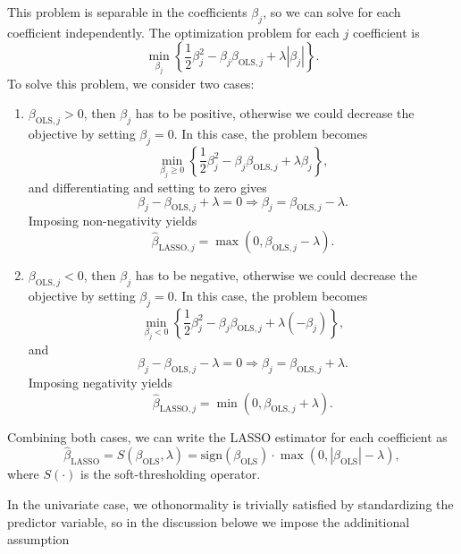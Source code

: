 \documentclass[11pt]{article}
\begin{document}
This problem is separable in the coefficients $\beta_j$, so we can solve for each coefficient independently. The optimization problem for each $j$ coefficient is
\[\min_{\beta_j} \left\{\frac{1}{2} \beta_j^2 - \beta_j \beta_{\text{OLS},j} + \lambda |\beta_j| \right\}.\]
To solve this problem, we consider two cases:
\begin{enumerate}
    \item $\beta_{\text{OLS},j} > 0$, then $\beta_j$ has to be positive, otherwise we could decrease the objective by setting $\beta_j = 0$. 
    In this case, the problem becomes 
    \[\min_{\beta_j \geq 0} \left\{ \frac{1}{2} \beta_j^2 - \beta_j \beta_{\text{OLS},j} + \lambda \beta_j \right\},\]
    and differentiating and setting to zero gives
    \[\beta_j - \beta_{\text{OLS},j} + \lambda = 0 \Rightarrow \beta_j = \beta_{\text{OLS},j} - \lambda.\]
    Imposing non-negativity yields
    \[\hat{\beta}_{\text{LASSO},j} = \max\left(0, \beta_{\text{OLS},j} - \lambda\right).\]
    \item $\beta_{\text{OLS},j} < 0$, then $\beta_j$ has to be negative, otherwise we could decrease the objective by setting $\beta_j = 0$. In this case, the problem becomes
    \[\min_{\beta_j < 0} \left\{ \frac{1}{2} \beta_j^2 - \beta_j \beta_{\text{OLS},j} + \lambda (-\beta_j) \right\},\]    
    and
    \[\beta_j - \beta_{\text{OLS},j} - \lambda = 0 \Rightarrow \beta_j = \beta_{\text{OLS},j} + \lambda.\]
    Imposing negativity yields
    \[\hat{\beta}_{\text{LASSO},j} = \min\left(0, \beta_{\text{OLS},j} + \lambda\right).\]
\end{enumerate}

Combining both cases, we can write the LASSO estimator for each coefficient as
\begin{equation}\label{eq:lasso_from_ols}
\hat{\beta}_{\text{LASSO}} = S(\beta_{\text{OLS}}, \lambda) = \textrm{sign}(\beta_{\text{OLS}}) \cdot \max\left(0, |\beta_{\text{OLS}}| - \lambda\right),
\end{equation}
where $S(\cdot)$ is the soft-thresholding operator.

In the univariate case, we othonormality is trivially satisfied by standardizing the predictor variable, so in the discussion belowe we impose the addinitional assumption
\end{document}
